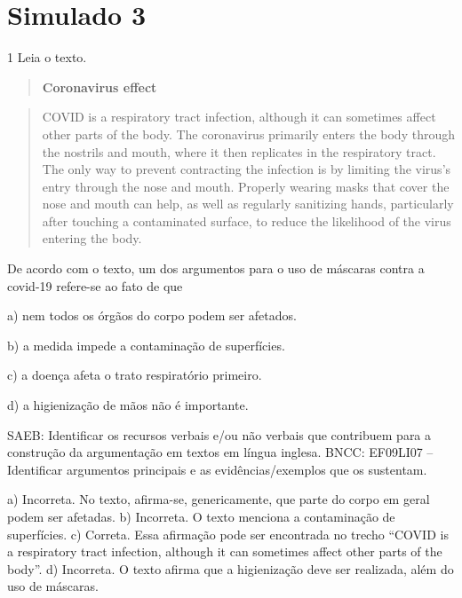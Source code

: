 \section{Simulado 3}\label{simulado-3}

\num{1} Leia o texto.

\begin{quote}
\textbf{Coronavirus effect}
\end{quote}

\begin{quote}
COVID is a respiratory tract infection, although it can sometimes affect
other parts of the body. The coronavirus primarily enters the body
through the nostrils and mouth, where it then replicates in the
respiratory tract. The only way to prevent contracting the infection is
by limiting the virus's entry through the nose and mouth. Properly
wearing masks that cover the nose and mouth can help, as well as
regularly sanitizing hands, particularly after touching a contaminated
surface, to reduce the likelihood of the virus entering the body.
\end{quote}


De acordo com o texto, um dos argumentos para o uso de máscaras contra a
covid-19 refere-se ao fato de que

a) nem todos os órgãos do corpo podem ser afetados.

b) a medida impede a contaminação de superfícies.

c) a doença afeta o trato respiratório primeiro.

d) a higienização de mãos não é importante.

SAEB: Identificar os recursos verbais e/ou não verbais que contribuem
para a construção da argumentação em textos em língua inglesa. BNCC:
EF09LI07 -- Identificar argumentos principais e as evidências/exemplos
que os sustentam.

a) Incorreta. No texto, afirma-se, genericamente, que parte do corpo em
geral podem ser afetadas. b) Incorreta. O texto menciona a contaminação
de superfícies. c) Correta. Essa afirmação pode ser encontrada no trecho
``COVID is a respiratory tract infection, although it can sometimes
affect other parts of the body''. d) Incorreta. O texto afirma que a
higienização deve ser realizada, além do uso de máscaras.

